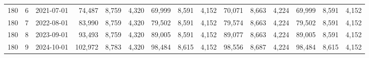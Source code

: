 \begin{longtable}{r r l r r r r r r r r r r r r}
180 & 6 & 2021-07-01 & 74{,}487 & 8{,}759 & 4{,}320 & 69{,}999 & 8{,}591 & 4{,}152 & 70{,}071 & 8{,}663 & 4{,}224 & 69{,}999 & 8{,}591 & 4{,}152 \\
180 & 7 & 2022-08-01 & 83{,}990 & 8{,}759 & 4{,}320 & 79{,}502 & 8{,}591 & 4{,}152 & 79{,}574 & 8{,}663 & 4{,}224 & 79{,}502 & 8{,}591 & 4{,}152 \\
180 & 8 & 2023-09-01 & 93{,}493 & 8{,}759 & 4{,}320 & 89{,}005 & 8{,}591 & 4{,}152 & 89{,}077 & 8{,}663 & 4{,}224 & 89{,}005 & 8{,}591 & 4{,}152 \\
180 & 9 & 2024-10-01 & 102{,}972 & 8{,}783 & 4{,}320 & 98{,}484 & 8{,}615 & 4{,}152 & 98{,}556 & 8{,}687 & 4{,}224 & 98{,}484 & 8{,}615 & 4{,}152 \\
\end{longtable}
\endgroup

\clearpage
